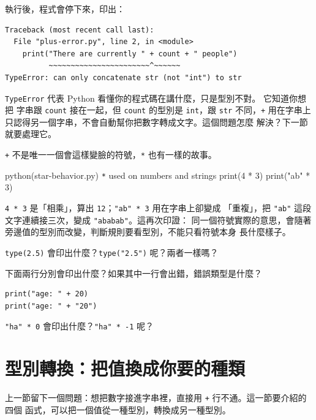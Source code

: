 執行後，程式會停下來，印出：

\begin{verbatim}
Traceback (most recent call last):
  File "plus-error.py", line 2, in <module>
    print("There are currently " + count + " people")
          ~~~~~~~~~~~~~~~~~~~~~~~^~~~~~~
TypeError: can only concatenate str (not "int") to str
\end{verbatim}

\texttt{TypeError} 代表 Python 看懂你的程式碼在講什麼，只是型別不對。
它知道你想把
字串跟 \texttt{count} 接在一起，但 \texttt{count} 的型別是 \texttt{int}，跟 \texttt{str}
不同，\texttt{+} 用在字串上只認得另一個字串，不會自動幫你把數字轉成文字。這個問題怎麼
解決？下一節就要處理它。

\texttt{+} 不是唯一一個會這樣變臉的符號，\texttt{*} 也有一樣的故事。

\begin{example}{python}{(star-behavior.py) \texttt{*} used on numbers and strings}
print(4 * 3)
print("ab" * 3)
\end{example}


\texttt{4 * 3} 是「相乘」，算出 \texttt{12}；\texttt{"ab" * 3} 用在字串上卻變成
「重複」，把 \texttt{"ab"} 這段文字連續接三次，變成 \texttt{"ababab"}。這再次印證：
同一個符號實際的意思，會隨著旁邊值的型別而改變，判斷規則要看型別，不能只看符號本身
長什麼樣子。

\begin{drills}[label=drills:type-family]
\item \texttt{type(2.5)} 會印出什麼？\texttt{type("2.5")} 呢？兩者一樣嗎？
\item 下面兩行分別會印出什麼？如果其中一行會出錯，錯誤類型是什麼？
\begin{verbatim}
print("age: " + 20)
print("age: " + "20")
\end{verbatim}
\item \texttt{"ha" * 0} 會印出什麼？\texttt{"ha" * -1} 呢？
\end{drills}

\section{型別轉換：把值換成你要的種類}
\label{sec:type-conversion}

上一節留下一個問題：想把數字接進字串裡，直接用 \texttt{+} 行不通。這一節要介紹的四個
函式，可以把一個值從一種型別，轉換成另一種型別。

